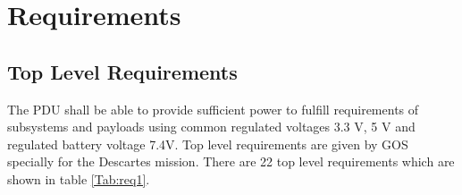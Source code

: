 \chapter{Requirements\label{cha:chapter3}}

\section{Top Level Requirements}
The PDU shall be able to provide sufficient power to fulfill requirements of subsystems and payloads using common regulated voltages 3.3 V, 5 V and regulated battery voltage 7.4V. Top level requirements are given by GOS specially for the Descartes mission. There are 22 top level requirements which are shown in table \ref{Tab:req1}.  \\ \\

